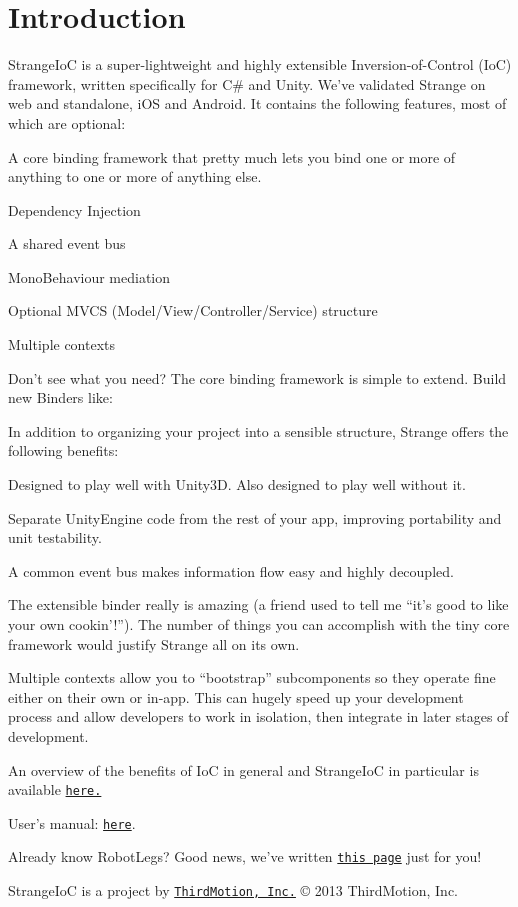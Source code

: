 \hypertarget{index_intro_sec}{}\section{Introduction}\label{index_intro_sec}
Strange\-Io\-C is a super-\/lightweight and highly extensible Inversion-\/of-\/\-Control (Io\-C) framework, written specifically for C\# and Unity. We’ve validated Strange on web and standalone, i\-O\-S and Android. It contains the following features, most of which are optional\-: 
\begin{DoxyItemize}
\item A core binding framework that pretty much lets you bind one or more of anything to one or more of anything else. 
\item Dependency Injection 
\item A shared event bus 
\item Mono\-Behaviour mediation 
\item Optional M\-V\-C\-S (Model/\-View/\-Controller/\-Service) structure 
\item Multiple contexts 
\item Don’t see what you need? The core binding framework is simple to extend. Build new Binders like\-: 
\end{DoxyItemize}In addition to organizing your project into a sensible structure, Strange offers the following benefits\-: 
\begin{DoxyItemize}
\item Designed to play well with Unity3\-D. Also designed to play well without it. 
\item Separate Unity\-Engine code from the rest of your app, improving portability and unit testability. 
\item A common event bus makes information flow easy and highly decoupled. 
\item The extensible binder really is amazing (a friend used to tell me “it’s good to like your own cookin’!”). The number of things you can accomplish with the tiny core framework would justify Strange all on its own. 
\item Multiple contexts allow you to “bootstrap” subcomponents so they operate fine either on their own or in-\/app. This can hugely speed up your development process and allow developers to work in isolation, then integrate in later stages of development. 
\end{DoxyItemize}An overview of the benefits of Io\-C in general and Strange\-Io\-C in particular is available \href{../../exec.html}{\tt here.} \par
 User's manual\-: \href{../../TheBigStrangeHowTo.html}{\tt here}. \par
 Already know Robot\-Legs? Good news, we've written \href{../../rl.html}{\tt this page} just for you!

Strange\-Io\-C is a project by \href{http://thirdmotion.com/}{\tt Third\-Motion, Inc.} \copyright{} 2013 Third\-Motion, Inc. 